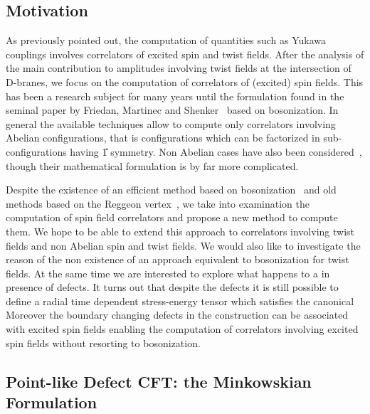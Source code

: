 \subsection{Motivation}

As previously pointed out, the computation of quantities such as Yukawa couplings involves correlators of excited spin and twist fields.
After the analysis of the main contribution to amplitudes involving twist fields at the intersection of D-branes, we focus on the computation of correlators of (excited) spin fields.
This has been a research subject for many years until the formulation found in the seminal paper by Friedan, Martinec and Shenker~\cite{Friedan:1986:ConformalInvarianceSupersymmetry} based on bosonization.
In general the available techniques allow to compute only correlators involving Abelian configurations, that is configurations which can be factorized in sub-configurations having \U{1} symmetry.
Non Abelian cases have also been considered~\cite{Inoue:1987:NonAbelianOrbifolds,Inoue:1990:StringInteractionsNonAbelian,Gato:1990:VertexOperatorsNonAbelian,Pesando:2016:FullyStringyComputation}, though their mathematical formulation is by far more complicated.
  
Despite the existence of an efficient method based on bosonization~\cite{Friedan:1986:ConformalInvarianceSupersymmetry} and old methods based on the Reggeon vertex~\cite{Sciuto:1969:GeneralVertexFunction,DiVecchia:1990:VertexIncludingEmission,Nilsson:1990:GeneralNSRString,DiBartolomeo:1990:GeneralPropertiesVertices,Petersen:1989:CovariantSuperreggeonCalculus}, we take into examination the computation of spin field correlators and propose a new method to compute them.
We hope to be able to extend this approach to correlators involving twist fields and non Abelian spin and twist fields.
We would also like to investigate the reason of the non existence of an approach equivalent to bosonization for twist fields.
At the same time we are interested to explore what happens to a \cft in presence of defects.
It turns out that despite the defects it is still possible to define a radial time dependent stress-energy tensor which satisfies the canonical \ope
Moreover the boundary changing defects in the construction can be associated with excited spin fields enabling the computation of correlators involving excited spin fields without resorting to bosonization.



\subsection{Point-like Defect CFT: the Minkowskian Formulation}
\label{sec:Mink_theory}
  
